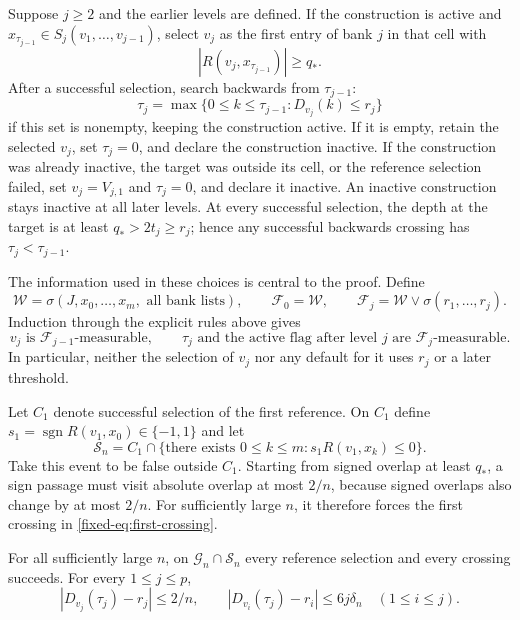 Suppose $j\ge2$ and the earlier levels are defined. If the construction
is active and $x_{\tau_{j-1}}\in S_j(v_1,\ldots,v_{j-1})$, select
$v_j$ as the first entry of bank $j$ in that cell with
\[
 |R(v_j,x_{\tau_{j-1}})|\ge q_*.
\]
After a successful selection, search backwards from $\tau_{j-1}$:
\begin{equation}\label{fixed-eq:backward-crossing}
 \tau_j=\max\{0\le k\le\tau_{j-1}:D_{v_j}(k)\le r_j\}
\end{equation}
if this set is nonempty, keeping the construction active. If it is
empty, retain the selected $v_j$, set $\tau_j=0$, and declare the
construction inactive. If the construction was already inactive, the
target was outside its cell, or the reference selection failed, set
$v_j=V_{j,1}$ and $\tau_j=0$, and declare it inactive. An inactive
construction stays inactive at all later levels. At every successful
selection, the depth at the target is at least $q_*>2t_j\ge r_j$;
hence any successful backwards crossing has $\tau_j<\tau_{j-1}$.

The information used in these choices is central to the proof. Define
\[
 \mathcal W=\sigma(J,x_0,\ldots,x_m,\text{ all bank lists}),\qquad
 \mathcal F_0=\mathcal W,\qquad
 \mathcal F_j=\mathcal W\vee\sigma(r_1,\ldots,r_j).
\]
Induction through the explicit rules above gives
\begin{equation}\label{fixed-eq:filtration}
 v_j\text{ is }\mathcal F_{j-1}\text{-measurable},\qquad
 \tau_j\text{ and the active flag after level }j
       \text{ are }\mathcal F_j\text{-measurable}.
\end{equation}
In particular, neither the selection of $v_j$ nor any default for it
uses $r_j$ or a later threshold.

Let $C_1$ denote successful selection of the first reference. On $C_1$
define $s_1=\operatorname{sgn}R(v_1,x_0)\in\{-1,1\}$ and let
\begin{equation}\label{fixed-eq:sign-passage}
 \mathcal S_n=C_1\cap
 \{\text{there exists }0\le k\le m: s_1R(v_1,x_k)\le0\}.
\end{equation}
Take this event to be false outside $C_1$. Starting from signed
overlap at least $q_*$, a sign passage must visit absolute overlap at
most $2/n$, because signed overlaps also change by at most $2/n$.
For sufficiently large $n$, it therefore forces the first crossing
in \eqref{fixed-eq:first-crossing}.

\begin{lemma}
\label{fixed-lem:nested-crossings}
For all sufficiently large $n$, on $\mathcal G_n\cap\mathcal S_n$
every reference selection and every crossing succeeds. For every
$1\le j\le p$,
\begin{equation}\label{fixed-eq:nested-shells}
 |D_{v_j}(\tau_j)-r_j|\le2/n,\qquad
 |D_{v_i}(\tau_j)-r_i|\le6j\delta_n
                  \quad(1\le i\le j).
\end{equation}
\end{lemma}


